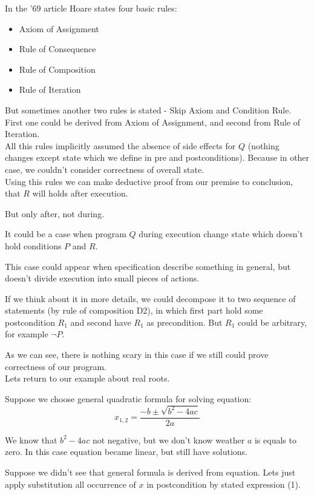 \documentclass[twoside,twocolumn]{article}
\begin{document}
In the '69 article Hoare states four basic rules:
\begin{itemize}
\item
  Axiom of Assignment
\item
  Rule of Consequence
\item
  Rule of Composition
\item
  Rule of Iteration
\end{itemize}
But sometimes another two rules is stated - Skip Axiom and Condition Rule. First
one could be derived from Axiom of Assignment, and second from Rule of
Iteration.\\

All this rules implicitly assumed the absence of side effects for $Q$ (nothing
changes except state which we define in pre and postconditions). Because in
other case, we couldn't consider correctness of overall state. \\ 

Using this rules we can make deductive proof from our premise to conclusion,
that $R$ will holds after execution. 

But only after, not during.

It could be a case when program $Q$ during execution
change state which doesn't hold conditions $P$ and $R$.

This case could appear when specification describe something in general, but
doesn't divide execution into small pieces of actions.

If we think about it in more details, we could decompose it to two sequence of
statements (by rule of composition D2), in which first part hold some postcondition
$R_1$ and second have $R_1$ as precondition. But $R_1$ could be arbitrary, for example
$\neg P$.

As we can see, there is nothing scary in this case if we still could prove
correctness of our program. \\

Lets return to our example about real roots.

Suppose we choose general quadratic formula for solving equation:
\begin{equation}
 x_{1,2} = \frac{-b \pm \sqrt{b^2 - 4ac}}{2a}
\end{equation}

We know that $b^2 - 4ac$ not negative, but we
don't know weather $a$ is equals to zero.
In this case equation became linear, but still have solutions. 

Suppose we didn't see that general formula is derived from equation. Lets just
apply substitution all occurrence of $x$ in postcondition by stated expression (1).
\end{document}

